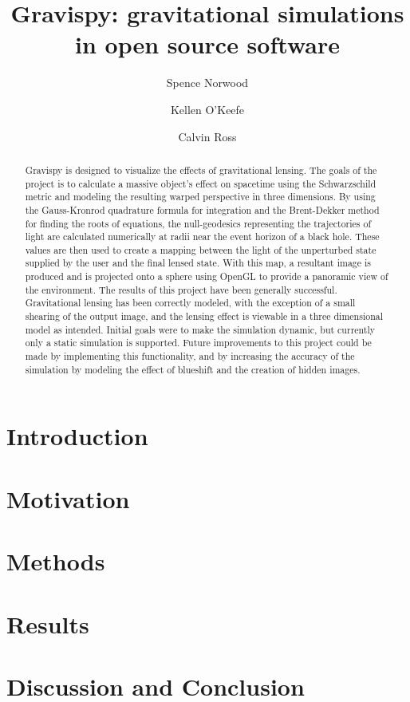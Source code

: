 \documentclass[
aps,prd,
preprint,
onecolumn,
12pt,
amsmath, amssymb,
secnumarabic,
]{revtex4-1}
\begin{document}
\title{Gravispy: gravitational simulations in open source software}
\author{Spence Norwood}
\author{Kellen O'Keefe}
\author{Calvin Ross}
\begin{abstract}
Gravispy is designed to visualize the effects of gravitational lensing.
The goals of the project is to calculate a massive object's effect on spacetime using the Schwarzschild metric and modeling the resulting warped perspective in three dimensions.
By using the Gauss-Kronrod quadrature formula for integration and the Brent-Dekker method for finding the roots of equations, the null-geodesics representing the trajectories of light are calculated numerically at radii near the event horizon of a black hole.
These values are then used to create a mapping between the light of the unperturbed state supplied by the user and the final lensed state.
With this map, a resultant image is produced and is projected onto a sphere using OpenGL to provide a panoramic view of the environment.
The results of this project have been generally successful.
Gravitational lensing has been correctly modeled, with the exception of a small shearing of the output image, and the lensing effect is viewable in a three dimensional model as intended.
Initial goals were to make the simulation dynamic, but currently only a static simulation is supported.
Future improvements to this project could be made by implementing this functionality, and by increasing the accuracy of the simulation by modeling the effect of blueshift and the creation of hidden images.
\end{abstract}
\maketitle

\section{Introduction\label{sec:intro}}


\section{Motivation\label{sec:motive}}


\section{Methods\label{sec:method}}


\section{Results\label{sec:results}}


\section{Discussion and Conclusion}


\nocite{*}

\end{document}
